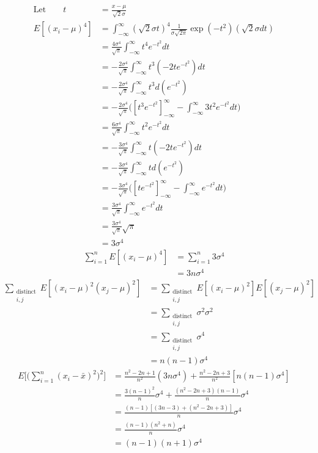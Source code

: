 \documentclass[12pt,a4paper]{report}
\begin{document}
\begin{align*}
\text{Let} \qquad t &= \frac{x-\mu}{\sqrt{2}\sigma} \\
E[(x_i - \mu)^4] &= \int_{-\infty}^{\infty} (\sqrt{2}\sigma t)^4 \frac{1}{\sigma \sqrt{2\pi}} \exp (-t^2) (\sqrt{2}\sigma dt) \\
&= \frac{4\sigma^4}{\sqrt{\pi}} \int_{-\infty}^{\infty} t^4  e^{-t^2} dt \\
&= -\frac{2\sigma^4}{\sqrt{\pi}} \int_{-\infty}^{\infty} t^3 (-2t e^{-t^2}) dt \\
&= -\frac{2\sigma^4}{\sqrt{\pi}} \int_{-\infty}^{\infty} t^3 d(e^{-t^2}) \\
&= -\frac{2\sigma^4}{\sqrt{\pi}} \Bigg( [t^3 e^{-t^2}]_{-\infty}^{\infty} -\int_{-\infty}^{\infty} 3t^2 e^{-t^2} dt \Bigg) \\
&= \frac{6\sigma^4}{\sqrt{\pi}} \int_{-\infty}^{\infty} t^2 e^{-t^2} dt \\
&= -\frac{3\sigma^4}{\sqrt{\pi}} \int_{-\infty}^{\infty} t (-2t e^{-t^2}) dt \\
&= -\frac{3\sigma^4}{\sqrt{\pi}} \int_{-\infty}^{\infty} t d(e^{-t^2}) \\
&= -\frac{3\sigma^4}{\sqrt{\pi}} \Bigg( [t e^{-t^2}]_{-\infty}^{\infty} -\int_{-\infty}^{\infty} e^{-t^2} dt \Bigg) \\
&= \frac{3\sigma^4}{\sqrt{\pi}} \int_{-\infty}^{\infty} e^{-t^2} dt \\
&= \frac{3\sigma^4}{\sqrt{\pi}} \sqrt{\pi} \\
&= 3\sigma^4
\end{align*}
\begin{align*}
\sum_{i = 1}^{n} E[(x_i - \mu)^4]
&=\sum_{i = 1}^{n} 3\sigma^4 \\
&= 3n \sigma^4
\end{align*}
\begin{align*}
\sum_{\substack{\text{distinct} \\ i,j}} E[(x_i - \mu)^2 (x_j - \mu)^2]
&= \sum_{\substack{\text{distinct} \\ i,j}} E[(x_i - \mu)^2] E[(x_j - \mu)^2] \\
&= \sum_{\substack{\text{distinct} \\ i,j}} \sigma^2 \sigma^2 \\
&= \sum_{\substack{\text{distinct} \\ i,j}} \sigma^4 \\
&= n(n-1) \sigma^4
\end{align*}
\begin{align*}
E \Bigg[ \Bigg( \sum_{i = 1}^{n} (x_i - \bar{x})^2 \Bigg)^2 \Bigg]
&= \frac{n^2-2n+1}{n^2} (3n \sigma^4) + \frac{n^2-2n+3}{n^2} [n(n-1) \sigma^4] \\
&= \frac{3(n-1)^2}{n} \sigma^4 + \frac{(n^2-2n+3)(n-1)}{n} \sigma^4 \\
&= \frac{(n-1)[(3n-3)+(n^2-2n+3)]}{n} \sigma^4 \\
&= \frac{(n-1)(n^2+n)}{n} \sigma^4 \\
&= (n-1)(n+1) \sigma^4 \\
\end{align*}
\end{document}
